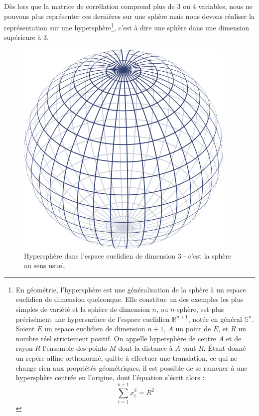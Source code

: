 Dès lors que la matrice de corrélation comprend plus de 3 ou 4 variables, nous ne pouvons plus représenter ces dernières sur une sphère mais nous devons réaliser la représentation sur une hypersphère\footnote{En géométrie, l'hypersphère est une généralisation de la sphère à un espace euclidien de dimension quelconque. Elle constitue un des exemples les plus simples de variété et la sphère de dimension $n$, ou $n$-sphère, est plus précisément une hypersurface de l'espace euclidien $\mathbb{R}^{n + 1}$, notée en général ${\mathbb S}^{n}$. Soient $E$ un espace euclidien de dimension $n+1$, $A$ un point de $E$, et $R$ un nombre réel strictement positif. On appelle hypersphère de centre $A$ et de rayon $R$ l'ensemble des points $M$ dont la distance à $A$ vaut $R$. Étant donné un repère affine orthonormé, quitte à effectuer une translation, ce qui ne change rien aux propriétés géométriques, il est possible de se ramener à une hypersphère centrée en l'origine, dont l'équation s'écrit alors : $$\sum_{i=1}^{n+1} x_i^2=R^2$$}, c'est à dire une sphère dans une dimension supérieure à 3.\newline

\begin{figure}[H]\begin{center}\includegraphics[scale=0.35]{ilu/sphere.png}\caption{Hypersphère dans l'espace euclidien de dimension 3 - c'est la sphère au sens usuel.}\end{center}\end{figure}

